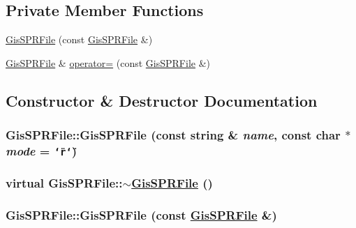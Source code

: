 \subsection*{Private Member Functions}
\begin{CompactItemize}
\item 
\hyperlink{classGisSPRFile_d0}{Gis\-SPRFile} (const \hyperlink{classGisSPRFile}{Gis\-SPRFile} \&)
\item 
\hyperlink{classGisSPRFile}{Gis\-SPRFile} \& \hyperlink{classGisSPRFile_d1}{operator=} (const \hyperlink{classGisSPRFile}{Gis\-SPRFile} \&)
\end{CompactItemize}


\subsection{Constructor \& Destructor Documentation}
\hypertarget{classGisSPRFile_a0}{
\subsubsection[GisSPRFile]{\setlength{\rightskip}{0pt plus 5cm}Gis\-SPRFile::Gis\-SPRFile (const string \& {\em name}, const char $\ast$ {\em mode} = {\tt \char`\"{}r\char`\"{}})}}
\label{classGisSPRFile_a0}


\hypertarget{classGisSPRFile_a1}{
\subsubsection[$\sim$GisSPRFile]{\setlength{\rightskip}{0pt plus 5cm}virtual Gis\-SPRFile::$\sim$\hyperlink{classGisSPRFile}{Gis\-SPRFile} ()}}
\label{classGisSPRFile_a1}


\hypertarget{classGisSPRFile_d0}{
\subsubsection[GisSPRFile]{\setlength{\rightskip}{0pt plus 5cm}Gis\-SPRFile::Gis\-SPRFile (const \hyperlink{classGisSPRFile}{Gis\-SPRFile} \&)}}
\label{classGisSPRFile_d0}




